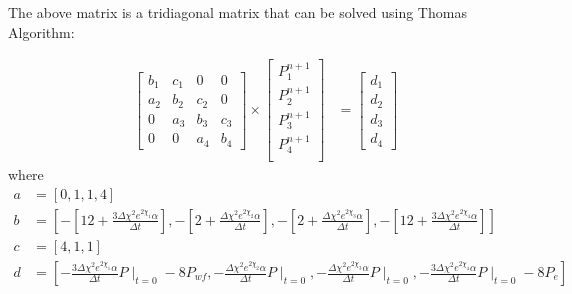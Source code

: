 \documentclass[12pt,letterpaper,titlepage]{article}
\begin{document}
The above matrix is a tridiagonal matrix that can be solved using Thomas Algorithm:

\renewcommand{\arraystretch}{2}
 \[ \begin{aligned}
    & \begin{bmatrix} 
     b_1 & c_1 & 0 & 0 \\ 
     a_2 & b_2 & c_2 & 0 \\
        0 &  a_3 & b_3 & c_3 \\
       0&0&a_4& b_4
 \end{bmatrix} 
  \times \begin{bmatrix} 
      P^{n+1}_1        \\ 
      P^{n+1}_2        \\ 
      P^{n+1}_3        \\ 
      P^{n+1}_4        \\ 
    \end{bmatrix} &= \left[\begin{array}{l}  d_1\\d_2\\d_3\\d_4  \end{array}\right]
\end{aligned}  \] 
where
\begin{align*}
a&=\left[0,1,1,4\right]\\
b&=\left[-[12+\frac{3\Delta\chi^2 e^{2\chi_1}\alpha}{\Delta t}], -[2+\frac{\Delta\chi^2 e^{2\chi_2}\alpha}{\Delta t}], -[2+\frac{\Delta\chi^2 e^{2\chi_3}\alpha}{\Delta t}], -[12+\frac{3\Delta\chi^2 e^{2\chi_4}\alpha}{\Delta t}]\right]\\
c&=[4,1,1]\\
d&=\left[-\frac{3\Delta\chi^2 e^{2\chi_1}\alpha}{\Delta t}P\mid_{t=0}-8  P_{wf}, -\frac{\Delta\chi^2e^{2\chi_2}\alpha}{\Delta t} P\mid_{t=0}, -\frac{\Delta\chi^2e^{2\chi_3}\alpha}{\Delta t} P\mid_{t=0}, -\frac{3\Delta\chi^2 e^{2\chi_4}\alpha}{\Delta t}P\mid_{t=0}-8  P_{e}\right]
\end{align*}
\end{document}
